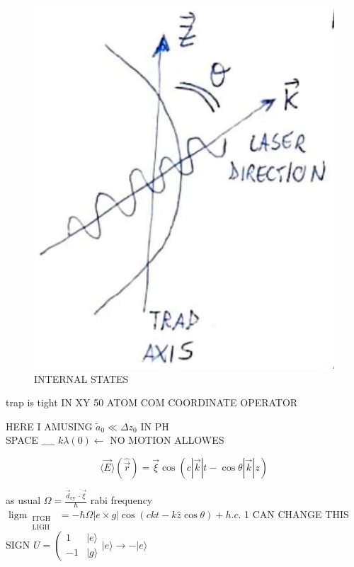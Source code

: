\documentclass[10pt]{article}
\begin{document}
\begin{figure}[h]
\begin{center}
  \includegraphics[width=\textwidth]{2025_10_16_9146de9f5ba4f09535e7g-3}
\captionsetup{labelformat=empty}
\caption{INTERNAL STATES}
\end{center}
\end{figure}

trap is tight IN XY 50 ATOM COM COORDINATE OPERATOR

HERE I AMUSING $\tilde{a}_{0} \ll \Delta z_{0}$ IN PH\\
SPACE $\_\_\_\_$ $k \lambda (0) \longleftarrow$ NO MOTION ALLOWES

$$
\langle\vec{E}\rangle(\hat{\vec{r}})=\vec{\xi} \cos (c|\vec{k}| t-\cos \theta|\vec{k}| z)
$$

as usual $\Omega=\frac{\vec{d}_{\text {ey }} \cdot \vec{\xi}}{\hbar}$ rabi frequency $\operatorname{ligm}_{\substack{\text { ITGH } \\ \text { LIGH }}}=-\hbar \Omega|e \times g| \cos (c k t-k \hat{z} \cos \theta)+h . c$. 1 CAN CHANGE THIS SIGN $U=\left(\begin{array}{ll}1 & |e\rangle \\ -1 & |g\rangle\end{array}\right. |e\rangle \rightarrow-|e\rangle$
\end{document}
